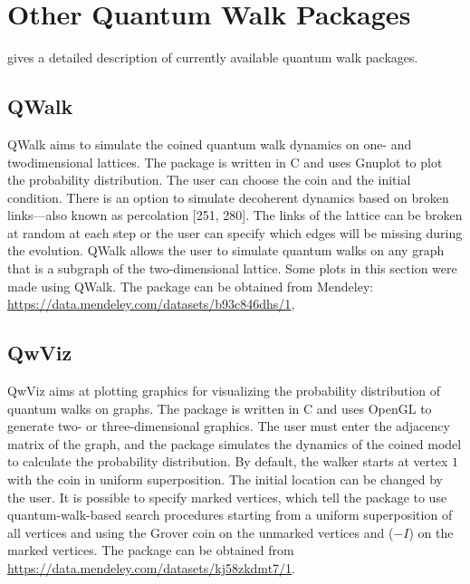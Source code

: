 \chapter{Other Quantum Walk Packages}


\cite{Portugal} gives a detailed description of currently available quantum walk packages.

\section{QWalk}

QWalk aims to simulate the coined quantum walk dynamics on one- and twodimensional lattices. The package is written in C and uses Gnuplot to plot the probability distribution. The user can choose the coin and the initial condition. There is an option to simulate decoherent dynamics based on broken links—also known as percolation [251, 280]. The links of the lattice can be broken at random at each step or the user can specify which edges will be missing during the evolution. QWalk allows the user to simulate quantum walks on any graph that is a subgraph of the two-dimensional lattice. Some plots in this section were made using QWalk. The package can be obtained from Mendeley: \url{https://data.mendeley.com/datasets/b93c846dhs/1}, 


\section{QwViz}

QwViz aims at plotting graphics for visualizing the probability distribution of quantum walks on graphs. The package is written in C and uses OpenGL to generate two- or three-dimensional graphics. The user must enter the adjacency matrix of the graph, and the package simulates the dynamics of the coined model to calculate the probability distribution. By default, the walker starts at vertex $1$ with the coin in uniform superposition. The initial location can be changed by the user. It is possible to specify marked vertices, which tell the package to use quantum-walk-based search procedures starting from a uniform superposition of all vertices and using the Grover coin on the unmarked vertices and ($−I$) on the marked vertices. The package can be obtained from \url{https://data.mendeley.com/datasets/kj58zkdmt7/1}.

